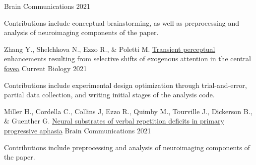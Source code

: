 \begin{cventries}
    {Brain Communications}
    {2021}
    {
      \begin{cvitems}
        \item {Contributions include conceptual brainstorming, as well as preprocessing and analysis of neuroimaging components of the paper.}
      \end{cvitems}
    }
  \cventry
    {Zhang Y., Shelchkova N., Ezzo R., \& Poletti M.}
    {\href{https://www.sciencedirect.com/science/article/pii/S0960982221004784}{Transient perceptual enhancements resulting from selective shifts of exogenous attention in the central fovea}}
    {Current Biology}
    {2021}
    {
      \begin{cvitems}
        \item {Contributions include experimental design optimization through trial-and-error, partial data collection, and writing initial stages of the analysis code.}
      \end{cvitems}
    }
  \cventry
    {Miller H., Cordella C., Collins J, Ezzo R., Quimby M., Tourville J., Dickerson B., \& Guenther G.}
    {\href{https://academic.oup.com/braincomms/article/3/1/fcab015/6137835?guestAccessKey=0969b931-ba98-4084-ac4b-4f2ca3bcb76c}{Neural substrates of verbal repetition deficits in primary progressive aphasia}}
    {Brain Communications}
    {2021}
    {
      \begin{cvitems}
        \item {Contributions include preprocessing and analysis of neuroimaging components of the paper.}
      \end{cvitems}
    }

\end{cventries}
